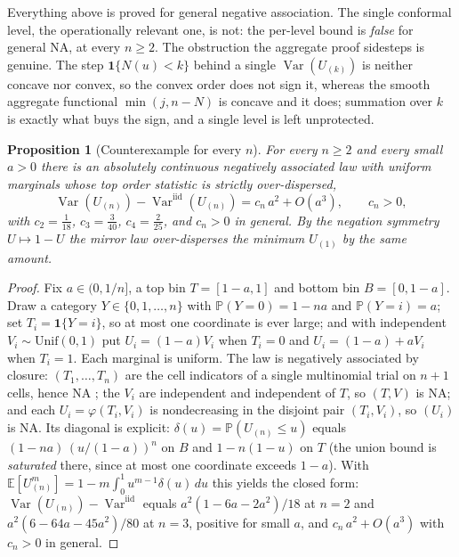 \documentclass[11pt]{article}
\newtheorem{proposition}{Proposition}
\begin{document}
Everything above is proved for general negative association. The single conformal level, the
operationally relevant one, is not: the per-level bound is
\emph{false} for general NA, at every $n\ge2$. The obstruction the aggregate proof sidesteps is
genuine. The step $\mathbf 1\{N(u)<k\}$ behind a single $\operatorname{Var}(U_{(k)})$ is neither
concave nor convex, so the convex order does not sign it, whereas the smooth aggregate functional
$\min(j,n-N)$ is concave and it does; summation over $k$ is exactly what buys the sign, and a single
level is left unprotected.

\begin{proposition}[Counterexample for every $n$]\label{prop:counter}
For every $n\ge2$ and every small $a>0$ there is an absolutely continuous negatively associated law
with uniform marginals whose top order statistic is strictly over-dispersed,
\[
\operatorname{Var}(U_{(n)})-\operatorname{Var}^{\mathrm{iid}}(U_{(n)})=c_n\,a^2+O(a^3),\qquad c_n>0 ,
\]
with $c_2=\tfrac1{18}$, $c_3=\tfrac3{40}$, $c_4=\tfrac2{25}$, and $c_n>0$ in general. By the negation
symmetry $U\mapsto1-U$ the mirror law over-disperses the minimum $U_{(1)}$ by the same amount.
\end{proposition}

\begin{proof}
Fix $a\in(0,1/n]$, a top bin $T=[1-a,1]$ and bottom bin $B=[0,1-a]$. Draw a category
$Y\in\{0,1,\dots,n\}$ with $\mathbb P(Y=0)=1-na$ and $\mathbb P(Y=i)=a$; set $T_i=\mathbf 1\{Y=i\}$, so
at most one coordinate is ever large; and with independent $V_i\sim\mathrm{Unif}(0,1)$ put
$U_i=(1-a)V_i$ when $T_i=0$ and $U_i=(1-a)+aV_i$ when $T_i=1$. Each marginal is uniform. The law is
negatively associated by closure: $(T_1,\dots,T_n)$ are the cell indicators of a single multinomial
trial on $n+1$ cells, hence NA \citep{joagdev1983}; the $V_i$ are independent and independent of $T$,
so $(T,V)$ is NA; and each $U_i=\varphi(T_i,V_i)$ is nondecreasing in the disjoint pair $(T_i,V_i)$, so
$(U_i)$ is NA. Its diagonal is explicit: $\delta(u)=\mathbb P(U_{(n)}\le u)$ equals
$(1-na)\,(u/(1-a))^n$ on $B$ and $1-n(1-u)$ on $T$ (the union bound is \emph{saturated} there, since at
most one coordinate exceeds $1-a$). With $\mathbb E[U_{(n)}^m]=1-m\int_0^1u^{m-1}\delta(u)\,du$ this
yields the closed form: $\operatorname{Var}(U_{(n)})-\operatorname{Var}^{\mathrm{iid}}$ equals
$a^2(1-6a-2a^2)/18$ at $n=2$ and $a^2(6-64a-45a^2)/80$ at $n=3$, positive for small $a$, and
$c_n\,a^2+O(a^3)$ with $c_n>0$ in general.
\end{proof}
\end{document}

